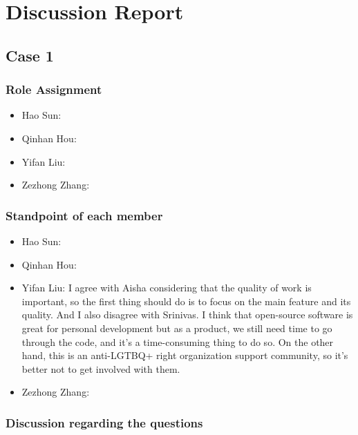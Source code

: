 \newpage
\section{Discussion Report}
	\subsection{Case 1}
		\subsubsection{Role Assignment}
		\begin{itemize}
  			\item Hao Sun: 
  			\item Qinhan Hou:
  			\item Yifan Liu:
  			\item Zezhong Zhang:
		\end{itemize}
		\subsubsection{Standpoint of each member}
		\begin{itemize}
  			\item Hao Sun: 
  			\item Qinhan Hou:
  			\item Yifan Liu: I agree with Aisha considering that the quality of work is important, so the first thing should do is to focus on the main feature and its quality. And I also disagree with Srinivas. I think that open-source software is great for personal development but as a product, we still need time to go through the code, and it's a time-consuming thing to do so. On the other hand, this is an anti-LGTBQ+ right organization support community, so it's better not to get involved with them.
  			\item Zezhong Zhang:
		\end{itemize}
		\subsubsection{Discussion regarding the questions}